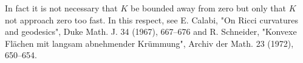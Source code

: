 \begin{remark}[Remark 3.5]
  \label{rem:dc-ch9-3-5}
  In fact it is not necessary that $K$ be bounded away from zero but only that $K$
  not approach zero too fast. In this respect, see E. Calabi, "On Ricci curvatures
  and geodesics", Duke Math. J. 34 (1967), 667–676 and R. Schneider, "Konvexe
  Flächen mit langsam abnehmender Krümmung", Archiv der Math. 23 (1972), 650–654.
\end{remark}
